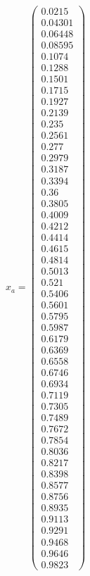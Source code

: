 \documentclass{udpreport}
\begin{document}
\begin{enumerate}
\begin{enumerate}
\begin{itemize}
					$x_{a} = \left(\begin{array}{c} 0.0215\\ 0.04301\\ 0.06448\\ 0.08595\\ 0.1074\\ 0.1288\\ 0.1501\\ 0.1715\\ 0.1927\\ 0.2139\\ 0.235\\ 0.2561\\ 0.277\\ 0.2979\\ 0.3187\\ 0.3394\\ 0.36\\ 0.3805\\ 0.4009\\ 0.4212\\ 0.4414\\ 0.4615\\ 0.4814\\ 0.5013\\ 0.521\\ 0.5406\\ 0.5601\\ 0.5795\\ 0.5987\\ 0.6179\\ 0.6369\\ 0.6558\\ 0.6746\\ 0.6934\\ 0.7119\\ 0.7305\\ 0.7489\\ 0.7672\\ 0.7854\\ 0.8036\\ 0.8217\\ 0.8398\\ 0.8577\\ 0.8756\\ 0.8935\\ 0.9113\\ 0.9291\\ 0.9468\\ 0.9646\\ 0.9823 \end{array}\right)$
										

\end{itemize}
\end{enumerate}
\end{enumerate}
\end{document}

